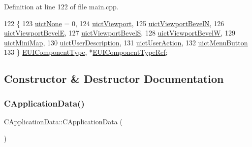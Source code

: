 Definition at line 122 of file main.\+cpp.


\begin{DoxyCode}
122                     \{
123             \hyperlink{classCApplicationData_ad49585591fc53bff1c89bc512170280da21bc83c610f1f8b1d686aed22d343f93}{uictNone} = 0,
124             \hyperlink{classCApplicationData_ad49585591fc53bff1c89bc512170280da07aa98dbeb8cfb8ba9cdbc06279732f2}{uictViewport},
125             \hyperlink{classCApplicationData_ad49585591fc53bff1c89bc512170280dacf49c7c3f42e286ec4f50e5801d8124b}{uictViewportBevelN},
126             \hyperlink{classCApplicationData_ad49585591fc53bff1c89bc512170280da141b8531beff649b3c5f1878913998bf}{uictViewportBevelE},
127             \hyperlink{classCApplicationData_ad49585591fc53bff1c89bc512170280dad008dbb58e954eec23792a7ef4f72200}{uictViewportBevelS},
128             \hyperlink{classCApplicationData_ad49585591fc53bff1c89bc512170280da199c7a8543278dfb4d9f53ab0b43ce6e}{uictViewportBevelW},
129             \hyperlink{classCApplicationData_ad49585591fc53bff1c89bc512170280dad6b8ace13bcd10900856e550d608bc1d}{uictMiniMap},
130             \hyperlink{classCApplicationData_ad49585591fc53bff1c89bc512170280dab72119ded1111e10add2cb44e6a32c9e}{uictUserDescription},
131             \hyperlink{classCApplicationData_ad49585591fc53bff1c89bc512170280da9b2752db122b319f942c3b69c2accfab}{uictUserAction},
132             \hyperlink{classCApplicationData_ad49585591fc53bff1c89bc512170280da8323c73a1745d4b4e6e469088041f264}{uictMenuButton}
133         \} \hyperlink{classCApplicationData_ad49585591fc53bff1c89bc512170280d}{EUIComponentType}, *\hyperlink{classCApplicationData_a117c7e1886e2db3be85388b120ad1d34}{EUIComponentTypeRef};
\end{DoxyCode}


\subsection{Constructor \& Destructor Documentation}
\hypertarget{classCApplicationData_a3d496acbdfac67ca25ee028d0703c492}{}\label{classCApplicationData_a3d496acbdfac67ca25ee028d0703c492} 
\subsubsection{\texorpdfstring{C\+Application\+Data()}{CApplicationData()}}
{\footnotesize\ttfamily C\+Application\+Data\+::\+C\+Application\+Data (\begin{DoxyParamCaption}{ }\end{DoxyParamCaption})}



